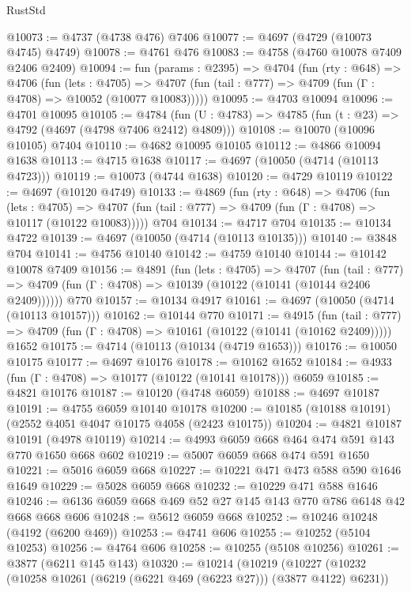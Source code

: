 \begin{lexlean}{RustStd}
\begin{coremodule}
@10073 := @4737 (@4738 @476) @7406
@10077 := @4697 (@4729 (@10073 @4745) @4749)
@10078 := @4761 @476
@10083 := @4758 (@4760 @10078 @7409 @2406 @2409)
@10094 := fun (params : @2395) =>
  @4704
    (fun (rty : @648) =>
    @4706
      (fun (lets : @4705) =>
      @4707 (fun (tail : @777) => @4709 (fun (Γ : @4708) => @10052 (@10077 @10083)))))
@10095 := @4703 @10094
@10096 := @4701 @10095
@10105 := @4784
    (fun (U : @4783) => @4785 (fun (t : @23) => @4792 (@4697 (@4798 @7406 @2412) @4809)))
@10108 := @10070 (@10096 @10105) @7404
@10110 := @4682 @10095 @10105
@10112 := @4866 @10094 @1638
@10113 := @4715 @1638
@10117 := @4697 (@10050 (@4714 (@10113 @4723)))
@10119 := @10073 (@4744 @1638)
@10120 := @4729 @10119
@10122 := @4697 (@10120 @4749)
@10133 := @4869
    (fun (rty : @648) =>
    @4706
      (fun (lets : @4705) =>
      @4707 (fun (tail : @777) => @4709 (fun (Γ : @4708) => @10117 (@10122 @10083)))))
    @704
@10134 := @4717 @704
@10135 := @10134 @4722
@10139 := @4697 (@10050 (@4714 (@10113 @10135)))
@10140 := @3848 @704
@10141 := @4756 @10140
@10142 := @4759 @10140
@10144 := @10142 @10078 @7409
@10156 := @4891
    (fun (lets : @4705) =>
    @4707
      (fun (tail : @777) =>
      @4709 (fun (Γ : @4708) => @10139 (@10122 (@10141 (@10144 @2406 @2409))))))
    @770
@10157 := @10134 @4917
@10161 := @4697 (@10050 (@4714 (@10113 @10157)))
@10162 := @10144 @770
@10171 := @4915
    (fun (tail : @777) => @4709 (fun (Γ : @4708) => @10161 (@10122 (@10141 (@10162 @2409)))))
    @1652
@10175 := @4714 (@10113 (@10134 (@4719 @1653)))
@10176 := @10050 @10175
@10177 := @4697 @10176
@10178 := @10162 @1652
@10184 := @4933 (fun (Γ : @4708) => @10177 (@10122 (@10141 @10178))) @6059
@10185 := @4821 @10176
@10187 := @10120 (@4748 @6059)
@10188 := @4697 @10187
@10191 := @4755 @6059 @10140 @10178
@10200 := @10185 (@10188 @10191) (@2552 @4051 @4047 @10175 @4058 (@2423 @10175))
@10204 := @4821 @10187 @10191 (@4978 @10119)
@10214 := @4993 @6059 @668 @464 @474 @591 @143 @770 @1650 @668 @602
@10219 := @5007 @6059 @668 @474 @591 @1650
@10221 := @5016 @6059 @668
@10227 := @10221 @471 @473 @588 @590 @1646 @1649
@10229 := @5028 @6059 @668
@10232 := @10229 @471 @588 @1646
@10246 := @6136 @6059 @668 @469 @52 @27 @145 @143 @770 @786 @6148 @42 @668 @668 @606
@10248 := @5612 @6059 @668
@10252 := @10246 @10248 (@4192 (@6200 @469))
@10253 := @4741 @606
@10255 := @10252 (@5104 @10253)
@10256 := @4764 @606
@10258 := @10255 (@5108 @10256)
@10261 := @3877 (@6211 @145 @143)
@10320 := @10214
    (@10219
      (@10227
        (@10232 (@10258 @10261 (@6219 (@6221 @469 (@6223 @27))) (@3877 @4122) @6231))

\end{coremodule}
\end{lexlean}
